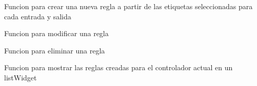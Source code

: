 \documentclass[letterpaper,10pt,spanish]{sphinxmanual}
\begin{document}
\begin{fulllineitems}
\label{\detokenize{codigos/FuzzyHandler:FuzzyHandler.rule_list_agregar}}
Funcion para crear una nueva regla a partir de las etiquetas seleccionadas para cada entrada y salida

\end{fulllineitems}


\begin{fulllineitems}
\label{\detokenize{codigos/FuzzyHandler:FuzzyHandler.rule_list_cambiar}}
Funcion para modificar una regla

\end{fulllineitems}


\begin{fulllineitems}
\label{\detokenize{codigos/FuzzyHandler:FuzzyHandler.rule_list_eliminar}}
Funcion para eliminar una regla

\end{fulllineitems}


\begin{fulllineitems}
\label{\detokenize{codigos/FuzzyHandler:FuzzyHandler.rule_list_visualizacion}}
Funcion para mostrar las reglas creadas para el controlador actual en un listWidget

\end{fulllineitems}

\end{document}
